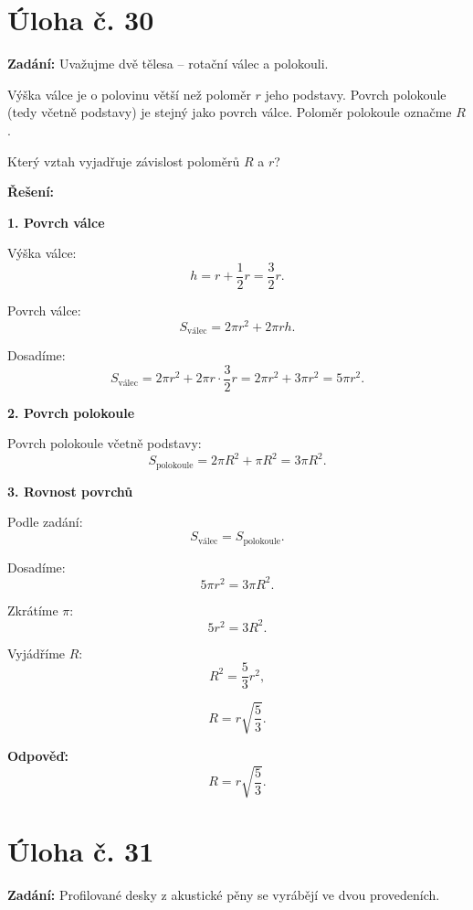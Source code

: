 \documentclass[12pt,a4paper]{article}
\begin{document}
\newpage
\section*{Úloha č. 30}

\textbf{Zadání:}  
Uvažujme dvě tělesa – rotační válec a polokouli.

Výška válce je o polovinu větší než poloměr \(r\) jeho podstavy.  
Povrch polokoule (tedy včetně podstavy) je stejný jako povrch válce.  
Poloměr polokoule označme \(R\).

Který vztah vyjadřuje závislost poloměrů \(R\) a \(r\)?

\bigskip

\textbf{Řešení:}

\textbf{1. Povrch válce}

Výška válce:
\[
h = r + \frac{1}{2}r = \frac{3}{2}r.
\]

Povrch válce:
\[
S_{\text{válec}} = 2\pi r^2 + 2\pi r h.
\]

Dosadíme:
\[
S_{\text{válec}} = 2\pi r^2 + 2\pi r \cdot \frac{3}{2}r
= 2\pi r^2 + 3\pi r^2
= 5\pi r^2.
\]

\medskip

\textbf{2. Povrch polokoule}

Povrch polokoule včetně podstavy:
\[
S_{\text{polokoule}} = 2\pi R^2 + \pi R^2 = 3\pi R^2.
\]

\medskip

\textbf{3. Rovnost povrchů}

Podle zadání:
\[
S_{\text{válec}} = S_{\text{polokoule}}.
\]

Dosadíme:
\[
5\pi r^2 = 3\pi R^2.
\]

Zkrátíme \(\pi\):
\[
5r^2 = 3R^2.
\]

Vyjádříme \(R\):
\[
R^2 = \frac{5}{3}r^2,
\]

\[
R = r\sqrt{\frac{5}{3}}.
\]

\bigskip

\textbf{Odpověď:}  
\[
R = r\sqrt{\frac{5}{3}}.
\]



\newpage
\section*{Úloha č. 31}

\textbf{Zadání:}  
Profilované desky z akustické pěny se vyrábějí ve dvou provedeních.
\end{document}
